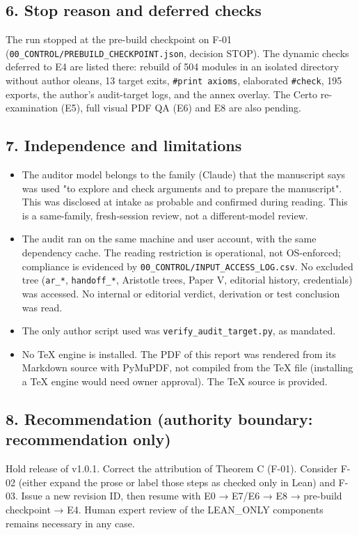 \documentclass[10pt,a4paper]{article}
\begin{document}
\subsection*{6. Stop reason and deferred checks}

The run stopped at the pre-build checkpoint on F-01 (\texttt{00\_CONTROL/PREBUILD\_CHECKPOINT.json}, decision STOP). The
dynamic checks deferred to E4 are listed there: rebuild of 504 modules in an isolated directory without author
oleans, 13 target exits, \texttt{\#print axioms}, elaborated \texttt{\#check}, 195 exports, the author's audit-target logs, and
the annex overlay. The Certo re-examination (E5), full visual PDF QA (E6) and E8 are also pending.

\subsection*{7. Independence and limitations}

\begin{itemize}\item The auditor model belongs to the family (Claude) that the manuscript says was used "to explore and check arguments and to prepare the manuscript". This was disclosed at intake as probable and confirmed during reading. This is a same-family, fresh-session review, not a different-model review.\item The audit ran on the same machine and user account, with the same dependency cache. The reading restriction is operational, not OS-enforced; compliance is evidenced by \texttt{00\_CONTROL/INPUT\_ACCESS\_LOG.csv}. No excluded tree (\texttt{ar\_*}, \texttt{handoff\_*}, Aristotle trees, Paper V, editorial history, credentials) was accessed. No internal or editorial verdict, derivation or test conclusion was read.\item The only author script used was \texttt{verify\_audit\_target.py}, as mandated.\item No TeX engine is installed. The PDF of this report was rendered from its Markdown source with PyMuPDF, not compiled from the TeX file (installing a TeX engine would need owner approval). The TeX source is provided.\end{itemize}

\subsection*{8. Recommendation (authority boundary: recommendation only)}

Hold release of v1.0.1. Correct the attribution of Theorem C (F-01). Consider F-02 (either expand the prose or
label those steps as checked only in Lean) and F-03. Issue a new revision ID, then resume with E0 → E7/E6 → E8 →
pre-build checkpoint → E4. Human expert review of the LEAN\_ONLY components remains necessary in any case.
\end{document}
